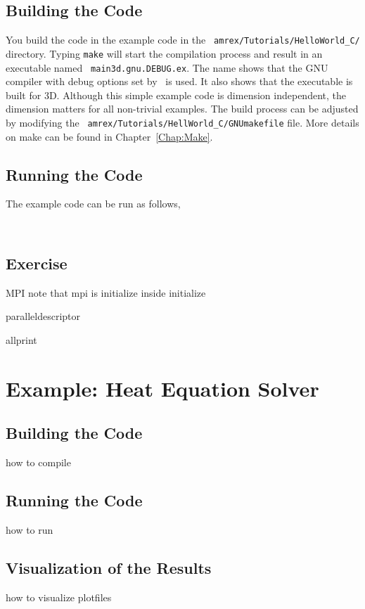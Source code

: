\subsection{Building the Code}

You build the code in the example code in the {\tt
  amrex/Tutorials/HelloWorld\_C/} directory.  Typing {\tt make} will
start the compilation process and result in an executable named {\tt
  main3d.gnu.DEBUG.ex}.  The name shows that the GNU compiler with
debug options set by \amrex\ is used.  It also shows that the
executable is built for 3D.  Although this simple example code is
dimension independent, the dimension matters for all non-trivial
examples.  The build process can be adjusted by modifying the {\tt
  amrex/Tutorials/HellWorld\_C/GNUmakefile} file.  More details on make
can be found in Chapter~\ref{Chap:Make}.

\subsection{Running the Code}

The example code can be run as follows,
\begin{verbatim}
  
\end{verbatim}



\subsection{Exercise}

MPI  note that mpi is initialize inside initialize

paralleldescriptor

allprint

\section{Example: Heat Equation Solver}

\subsection{Building the Code}

how to compile

\subsection{Running the Code}

how to run

\subsection{Visualization of the Results}

how to visualize plotfiles


